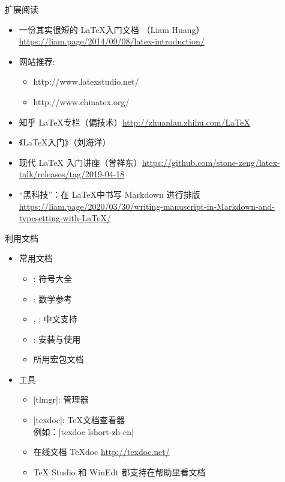 \begin{frame}{扩展阅读}
  \begin{itemize}
    \item 一份其实很短的 \LaTeX 入门文档 （Liam Huang） \url{https://liam.page/2014/09/08/latex-introduction/}
    \item 网站推荐:
      \begin{itemize}
        \item http://www.latexstudio.net/
        \item http://www.chinatex.org/
      \end{itemize}
    \item 知乎 \LaTeX 专栏（偏技术）\url{http://zhuanlan.zhihu.com/LaTeX}
    \item 《\LaTeX 入门》（刘海洋）
    \item 现代 LaTeX 入门讲座（曾祥东）\url{https://github.com/stone-zeng/latex-talk/releases/tag/2019-04-18}
    \item “黑科技”：在 \LaTeX 中书写 Markdown 进行排版 \url{https://liam.page/2020/03/30/writing-manuscript-in-Markdown-and-typesetting-with-LaTeX/}
  \end{itemize}
\end{frame}


\begin{frame}[fragile]{利用文档}
  \begin{itemize}
    \item 常用文档
      \begin{itemize}
        \item {}: 符号大全
        \item {}: 数学参考
        \item {}, : 中文支持
        \item {}: \TL 安装与使用
        \item 所用宏包文档
      \end{itemize}
    \item 工具
      \begin{itemize}
        \item |tlmgr|: \TL 管理器
        \item |texdoc|: \TeX 文档查看器\\
          例如：|texdoc lshort-zh-cn|
        \item 在线文档 \TeX doc \url{http://texdoc.net/}
        \item TeX Studio 和 WinEdt 都支持在帮助里看文档
      \end{itemize}
  \end{itemize}
\end{frame}

